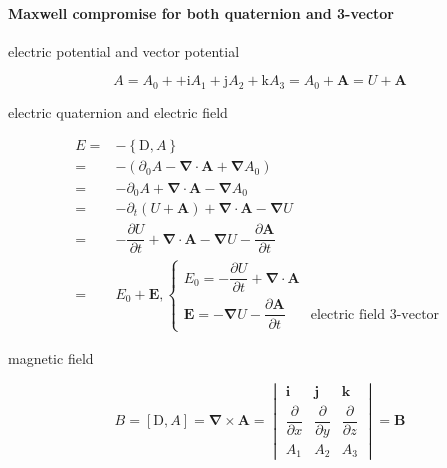 \documentclass[
]{book}
\theoremstyle{definition}
\theoremstyle{definition}
\theoremstyle{definition}
\theoremstyle{definition}
\theoremstyle{remark}
\begin{document}
\paragraph{Maxwell compromise for both quaternion and 3-vector}\label{maxwell-compromise-for-both-quaternion-and-3-vector}

electric potential and vector potential

\[
A=A_{{\scriptscriptstyle 0}}++\mathrm{i}A_{{\scriptscriptstyle 1}}+\mathrm{j}A_{{\scriptscriptstyle 2}}+\mathrm{k}A_{{\scriptscriptstyle 3}}=A_{0}+\boldsymbol{A}=U+\boldsymbol{A}
\]

electric quaternion and electric field

\[
\begin{aligned}
E= & -\left\{ \mathrm{D},A\right\} \\
= & -\left(\partial_{{\scriptscriptstyle 0}}A-\boldsymbol{\nabla}\cdot\boldsymbol{A}+\boldsymbol{\nabla}A_{{\scriptscriptstyle 0}}\right)\\
= & -\partial_{{\scriptscriptstyle 0}}A+\boldsymbol{\nabla}\cdot\boldsymbol{A}-\boldsymbol{\nabla}A_{{\scriptscriptstyle 0}}\\
= & -\partial_{{\scriptscriptstyle t}}\left(U+\boldsymbol{A}\right)+\boldsymbol{\nabla}\cdot\boldsymbol{A}-\boldsymbol{\nabla}U\\
= & -\dfrac{\partial U}{\partial t}+\boldsymbol{\nabla}\cdot\boldsymbol{A}-\boldsymbol{\nabla}U-\dfrac{\partial\boldsymbol{A}}{\partial t}\\
= & E_{{\scriptscriptstyle 0}}+\boldsymbol{E},\begin{cases}
E_{{\scriptscriptstyle 0}}=-\dfrac{\partial U}{\partial t}+\boldsymbol{\nabla}\cdot\boldsymbol{A}\\
\boldsymbol{E}=-\boldsymbol{\nabla}U-\dfrac{\partial\boldsymbol{A}}{\partial t} & \text{electric field 3-vector}
\end{cases}
\end{aligned}
\]

magnetic field

\[
B=\left[\mathrm{D},A\right]=\boldsymbol{\nabla}\times\boldsymbol{A}=\begin{vmatrix}\boldsymbol{i} & \boldsymbol{j} & \boldsymbol{k}\\
\dfrac{\partial}{\partial x} & \dfrac{\partial}{\partial y} & \dfrac{\partial}{\partial z}\\
A_{{\scriptscriptstyle 1}} & A_{{\scriptscriptstyle 2}} & A_{{\scriptscriptstyle 3}}
\end{vmatrix}=\boldsymbol{B}
\]
\end{document}
